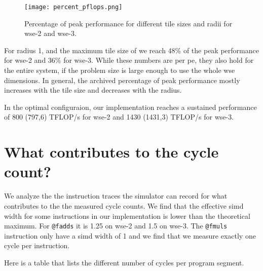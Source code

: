 \begin{figure}[h]
    \centering
    \texttt{[image: percent\_pflops.png]}
    \caption{Percentage of peak performance for different tile sizes and radii for \ac{wse}-2 and \ac{wse}-3.}
    \label{fig:percent_pflops}
\end{figure}

For radius 1, and the maximum tile size of  we reach \num{48}\% of the peak performance for \ac{wse}-2 and \num{36}\% for \ac{wse}-3.
While these numbers are per \ac{pe}, they also hold for the entire system, if the problem size is large enough to use the whole \ac{wse} dimensions.
In general, the archived percentage of peak performance mostly increases with the tile size and decreases with the radius.

In the optimal configuraion, our implementation reaches a sustained performance of 800 (797,6) TFLOP/s for \ac{wse}-2 and 1430 (1431,3) TFLOP/s for \ac{wse}-3.

\section{What contributes to the cycle count?}
We analyze the the instruction traces the simulator can record for what contributes to the the measured cycle counts.
We find that the effective simd width for some instructions in our implementation is lower than the theoretical maximum.
For \texttt{@fadds} it is 1.25 on wse-2 and 1.5 on wse-3.
The \texttt{@fmuls} instruction only have a simd width of 1 and we find that we measure exactly one cycle per instruction.

Here is a table that lists the different number of cycles per program segment. 